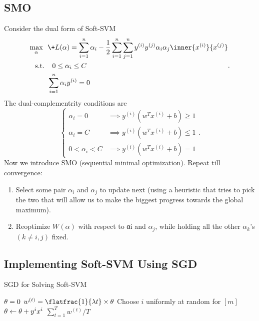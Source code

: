 \subsection{SMO}
Consider the dual form of Soft-SVM
\[
    \begin{aligned}
		\max_\alpha\ \ & \+L(\alpha)
		=
		\sum^{n}_{i=1} \alpha_i - 
		\frac{1}{2} \sum^{n}_{i=1} \sum^{n}_{j=1}
		y^{(i)}y^{(j)}\alpha_i\alpha_j
		\inner{x^{(i)}}{x^{(j)}}
		\\\text{s.t. }&\ \ 
		0\le \alpha_i\le C
		\\&
		\sum^{n}_{i=1} \alpha_iy^{(i)}=0
    \end{aligned}
.\] 
The dual-complementrity conditions are
\[
    \begin{cases}
		\alpha_i=0   &\implies y^{(i)}(w^Tx^{(i)}+b)\ge 1 \\
		\alpha_i=C   &\implies y^{(i)}(w^Tx^{(i)}+b)\le 1 \\
		0<\alpha_i<C &\implies y^{(i)}(w^Tx^{(i)}+b)=   1
    \end{cases}
.\] 
Now we introduce SMO (sequential minimal optimization).
Repeat till convergence:
\begin{enumerate}
	\item Select some pair $\alpha_i$ and $\alpha_j$ to update next (using a heuristic that tries to pick the two that will allow us to make the biggest progress towards the global maximum).
	\item
		Reoptimize $W(\alpha)$ with respect to αi and $\alpha_j$, while holding all the other $\alpha_k$'s $(k\ne i, j)$ fixed.
\end{enumerate}
\subsection{Implementing Soft-SVM Using SGD}
\begin{algorithm}
	\caption{SGD for Solving Soft-SVM}
	\begin{algorithmic}
		\STATE $\*\theta=\*0$
		\STATE $w^{(t)}=\flatfrac{1}{\lambda t}\times\*\theta$
		\STATE Choose $i$ uniformly at random for $[m]$
		\STATE $\*\theta\gets\*\theta+y^ix^i$
		\ENDIF
		\ENDFOR
		\RETURN $\sum_{t=1}^T w^{(t)}/T$
	\end{algorithmic}
\end{algorithm}
